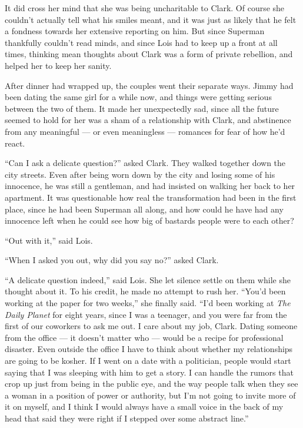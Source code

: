 It did cross her mind that she was being uncharitable to Clark. Of
course she couldn't actually tell what his smiles meant, and it was just
as likely that he felt a fondness towards her extensive reporting on
him. But since Superman thankfully couldn't read minds, and since Lois
had to keep up a front at all times, thinking mean thoughts about Clark
was a form of private rebellion, and helped her to keep her sanity.

After dinner had wrapped up, the couples went their separate ways. Jimmy
had been dating the same girl for a while now, and things were getting
serious between the two of them. It made her unexpectedly sad, since all
the future seemed to hold for her was a sham of a relationship with
Clark, and abstinence from any meaningful --- or even meaningless ---
romances for fear of how he'd react.

``Can I ask a delicate question?'' asked Clark. They walked together
down the city streets. Even after being worn down by the city and losing
some of his innocence, he was still a gentleman, and had insisted on
walking her back to her apartment. It was questionable how real the
transformation had been in the first place, since he had been Superman
all along, and how could he have had any innocence left when he could
see how big of bastards people were to each other?

``Out with it,'' said Lois.

``When I asked you out, why did you say no?'' asked Clark.

``A delicate question indeed,'' said Lois. She let silence settle on
them while she thought about it. To his credit, he made no attempt to
rush her. ``You'd been working at the paper for two weeks,'' she finally
said. ``I'd been working at \emph{The Daily Planet} for eight years,
since I was a teenager, and you were far from the first of our coworkers
to ask me out. I care about my job, Clark. Dating someone from the
office --- it doesn't matter who --- would be a recipe for professional
disaster. Even outside the office I have to think about whether my
relationships are going to be kosher. If I went on a date with a
politician, people would start saying that I was sleeping with him to
get a story. I can handle the rumors that crop up just from being in the
public eye, and the way people talk when they see a woman in a position
of power or authority, but I'm not going to invite more of it on myself,
and I think I would always have a small voice in the back of my head
that said they were right if I stepped over some abstract line.''

